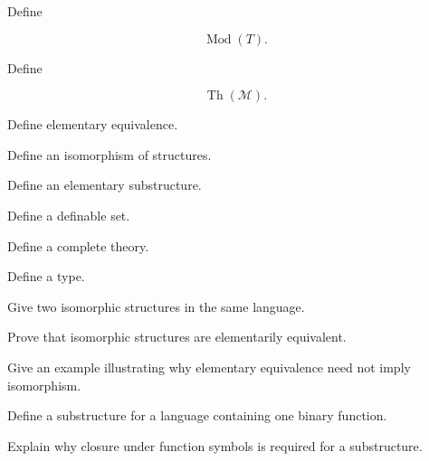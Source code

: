 \begin{exercise}[1]
Define

\[
\operatorname{Mod}(T).
\]
\end{exercise}

\begin{exercise}[1]
Define

\[
\operatorname{Th}(\mathcal{M}).
\]
\end{exercise}

\begin{exercise}[1]
Define elementary equivalence.
\end{exercise}

\begin{exercise}[1]
Define an isomorphism of structures.
\end{exercise}

\begin{exercise}[1]
Define an elementary substructure.
\end{exercise}

\begin{exercise}[1]
Define a definable set.
\end{exercise}

\begin{exercise}[1]
Define a complete theory.
\end{exercise}

\begin{exercise}[1]
Define a type.
\end{exercise}

\begin{exercise}[2]
Give two isomorphic structures in the same language.
\end{exercise}

\begin{exercise}[2]
Prove that isomorphic structures are elementarily equivalent.
\end{exercise}

\begin{exercise}[3]
Give an example illustrating why elementary equivalence need not imply
isomorphism.
\end{exercise}

\begin{exercise}[2]
Define a substructure for a language containing one binary function.
\end{exercise}

\begin{exercise}[3]
Explain why closure under function symbols is required for a substructure.
\end{exercise}

